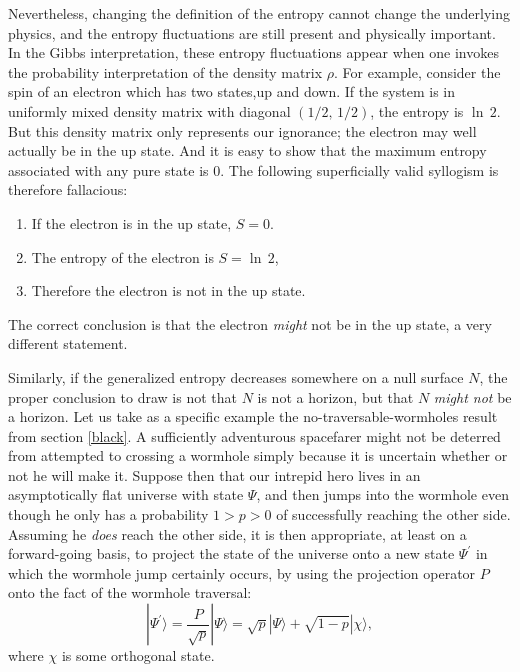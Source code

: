 \documentclass{article}
\begin{document}
Nevertheless, changing the definition of the entropy cannot change the underlying physics, and the entropy fluctuations are still present and physically important.  In the Gibbs interpretation, these entropy fluctuations appear when one invokes the probability interpretation of the density matrix $\rho$.  For example, consider the spin of an electron which has two states,up and down.  If the system is in uniformly mixed density matrix with diagonal $(1/2,\,1/2)$, the entropy is $\ln\,2$.  But this density matrix only represents our ignorance; the electron may well actually be in the up state.  And it is easy to show that the maximum entropy associated with any pure state is 0.  The following superficially valid syllogism is therefore fallacious:
\begin{enumerate}
\item If the electron is in the up state, $S = 0$.
\item The entropy of the electron is $S = \ln\,2$,
\item Therefore the electron is not in the up state.
\end{enumerate}
The correct conclusion is that the electron \emph{might} not be in the up state, a very different statement.  

Similarly, if the generalized entropy decreases somewhere on a null surface $N$, the proper conclusion to draw is not that $N$ is not a horizon, but that $N$ \emph{might not} be a horizon.  Let us take as a specific example the no-traversable-wormholes result from section \ref{black}.  A sufficiently adventurous spacefarer might not be deterred from attempted to crossing a wormhole simply because it is uncertain whether or not he will make it.  Suppose then that our intrepid hero lives in an asymptotically flat universe with state $\Psi$, and then jumps into the wormhole even though he only has a probability $1 > p > 0$ of successfully reaching the other side.  Assuming he \emph{does} reach the other side, it is then appropriate, at least on a forward-going basis, to project the state of the universe onto a new state $\Psi^\prime$ in which the wormhole jump certainly occurs, by using the projection operator $P$ onto the fact of the wormhole traversal:
\begin{equation}
| \Psi^\prime \rangle = \frac{P}{\sqrt{p}} | \Psi \rangle 
= \sqrt{p} | \Psi \rangle + \sqrt{1 - p} | \chi \rangle,
\end{equation}
where $\chi$ is some orthogonal state.
\end{document}
